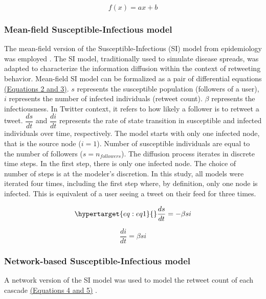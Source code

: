 \documentclass[11pt,a4paper]{article}
\begin{document}
        \begin{equation}
            f(x) = ax + b
        \end{equation}
        
        \subsubsection{Mean-field Susceptible-Infectious model}
        The mean-field version of the Susceptible-Infectious (SI) model from epidemiology was employed \cite{downey_epidemiology_2022}. The SI model, traditionally used to simulate disease spreads, was adapted to characterize the information diffusion within the context of retweeting behavior. Mean-field SI model can be formalized as a pair of differential equations \hyperlink{eq:eq1}{(Equations 2 and 3)}. $s$ represents the susceptible population (followers of a user), $i$ represents the number of infected individuals (retweet count). $\beta$ represents the infectiousness. In Twitter context, it refers to how likely a follower is to retweet a tweet. $\dfrac{ds}{dt}$ and $\dfrac{di}{dt}$ represents the rate of state transition in susceptible and infected individuals over time, respectively. The model starts with only one infected node, that is the source node ($i = 1$). Number of susceptible individuals are equal to the number of followers ($s = n_{followers}$). The diffusion process iterates in discrete time steps. In the first step, there is only one infected node. The choice of number of steps is at the modeler's discretion. In this study, all models were iterated four times, including the first step where, by definition, only one node is infected. This is equivalent of a user seeing a tweet on their feed for three times.

        \begin{equation}
            \hypertarget{eq:eq1}{}
            \frac{ds}{dt} = -\beta s i
        \end{equation}
    
        \begin{equation}
            \frac{di}{dt} = \beta s i
        \end{equation}

        \subsubsection{Network-based Susceptible-Infectious model}
        A network version of the SI model was used to model the retweet count of each cascade \hyperlink{eq:network-SI}{(Equations 4 and 5)} \cite{kermack_contribution_1927}. 
\end{document}
